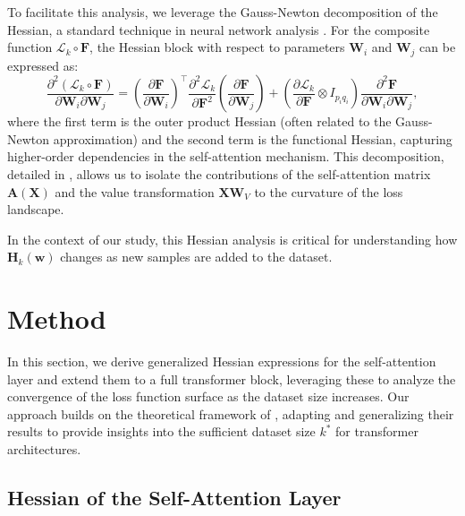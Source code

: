 \documentclass{article}
\begin{document}
To facilitate this analysis, we leverage the Gauss-Newton decomposition of the Hessian, a standard technique in neural network analysis \cite{ormaniec2024attentionhessian}. For the composite function $\mathcal{L}_k \circ \mathbf{F}$, the Hessian block with respect to parameters $\mathbf{W}_i$ and $\mathbf{W}_j$ can be expressed as:
\[
\frac{\partial^2 (\mathcal{L}_k \circ \mathbf{F})}{\partial \mathbf{W}_i \partial \mathbf{W}_j} = \left( \frac{\partial \mathbf{F}}{\partial \mathbf{W}_i} \right)^\top \frac{\partial^2 \mathcal{L}_k}{\partial \mathbf{F}^2} \left( \frac{\partial \mathbf{F}}{\partial \mathbf{W}_j} \right) + \left( \frac{\partial \mathcal{L}_k}{\partial \mathbf{F}} \otimes I_{p_i q_i} \right) \frac{\partial^2 \mathbf{F}}{\partial \mathbf{W}_i \partial \mathbf{W}_j},
\]
where the first term is the outer product Hessian (often related to the Gauss-Newton approximation) and the second term is the functional Hessian, capturing higher-order dependencies in the self-attention mechanism. This decomposition, detailed in \cite{ormaniec2024attentionhessian}, allows us to isolate the contributions of the self-attention matrix $\mathbf{A}(\mathbf{X})$ and the value transformation $\mathbf{X} \mathbf{W}_V$ to the curvature of the loss landscape.

In the context of our study, this Hessian analysis is critical for understanding how $\mathbf{H}_k(\mathbf{w})$ changes as new samples are added to the dataset.

\section{Method}\label{sec:method}

In this section, we derive generalized Hessian expressions for the self-attention layer and extend them to a full transformer block, leveraging these to analyze the convergence of the loss function surface as the dataset size increases. Our approach builds on the theoretical framework of \cite{ormaniec2024attentionhessian}, adapting and generalizing their results to provide insights into the sufficient dataset size \( k^* \) for transformer architectures.

\subsection{Hessian of the Self-Attention Layer}\label{subsec:hessian_self_attention}
\end{document}
